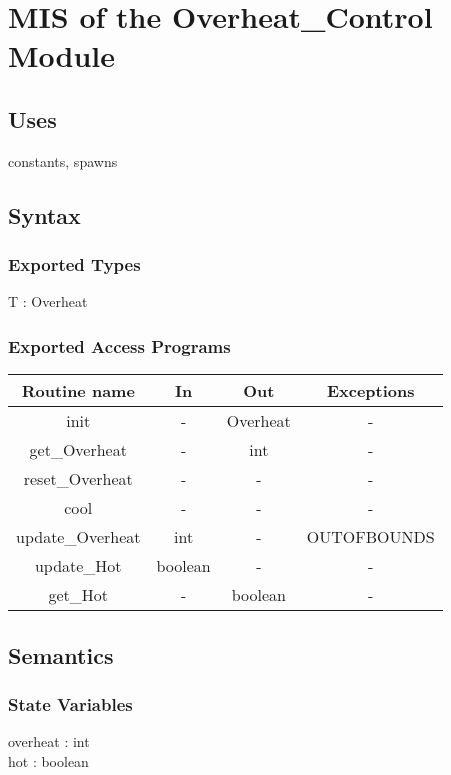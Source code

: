 \documentclass[12pt, titlepage]{article}
\begin{document}
\section {MIS of the Overheat\_Control Module}

\subsection {Uses}

constants, spawns

\subsection {Syntax}

\subsubsection {Exported Types}
T : Overheat
\subsubsection {Exported Access Programs}

\begin{tabular}{| c | c | c | c |}
\hline
\textbf{Routine name} & \textbf{In} & \textbf{Out} & \textbf{Exceptions}\\
\hline
init & - & Overheat & -  \\
\hline
get\_Overheat & - & int & -\\
\hline
reset\_Overheat & - & - & -\\
\hline 
cool & - & - & -\\
\hline
update\_Overheat & int & - & OUTOFBOUNDS\\
\hline
update\_Hot & boolean & - & -\\
\hline
get\_Hot & - & boolean & -\\
\end{tabular}

\subsection {Semantics}

\subsubsection {State Variables}
overheat : int\\
hot : boolean\\
\end{document}
